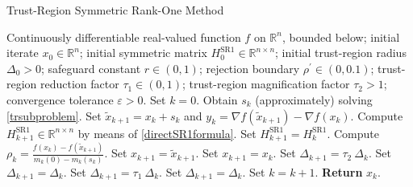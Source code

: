 \begin{algorithm}[H]
    \caption{Trust-Region Symmetric Rank-One Method}\label{TR-SR1Method}
    \begin{algorithmic}[1]
        \State Continuously differentiable real-valued function $f$ on $\mathbb{R}^n$, bounded below; initial iterate $x_0 \in \mathbb{R}^n$; initial symmetric matrix $H^{\mathrm{SR1}}_0 \in \mathbb{R}^{n \times n}$; initial trust-region radius $\Delta_0 > 0$; safeguard constant $r \in (0,1)$; rejection boundary $\rho^{\prime} \in (0, 0.1)$; trust-region reduction factor $\tau_1 \in (0,1)$; trust-region magnification factor $\tau_2 > 1$; convergence tolerance $\varepsilon > 0$. Set $k = 0$.
            \State Obtain $s_k$ (approximately) solving \cref{trsubproblem}.
            \State Set $\widetilde{x}_{k+1} = x_k + s_k$ and $y_k = \nabla f(\widetilde{x}_{k+1}) - \nabla f(x_k)$.
             \label{SR1ApproxUpdate}
                \State Compute $H^{\mathrm{SR1}}_{k+1} \in \mathbb{R}^{n \times n}$ by means of \cref{directSR1formula}. 
			\Else 
				\State Set $H^{\mathrm{SR1}}_{k+1} = H^{\mathrm{SR1}}_k$.
            \EndIf 
            \State Compute $\rho_k = \frac{f(x_k) - f(\widetilde{x}_{k+1})}{m_k(0) - m_k(s_k)}$.
             \label{SR1IterateUpdate}
                \State Set $x_{k+1} = \widetilde{x}_{k+1}$.
			\Else 
				\State Set $x_{k+1} = x_k$.
            \EndIf 
                    \State Set $\Delta_{k+1} = \tau_2 \ \Delta_k$.
                \Else 
                    \State Set $\Delta_{k+1} = \Delta_k$.
                \EndIf 
			\Else 
                    \State Set $\Delta_{k+1} = \tau_1 \ \Delta_k$.
                \Else 
                    \State Set $\Delta_{k+1} = \Delta_k$.
                \EndIf 
            \EndIf 
            \State Set $k = k+1$.
        \EndWhile
        \State \textbf{Return} $x_k$.
    \end{algorithmic}
\end{algorithm}

